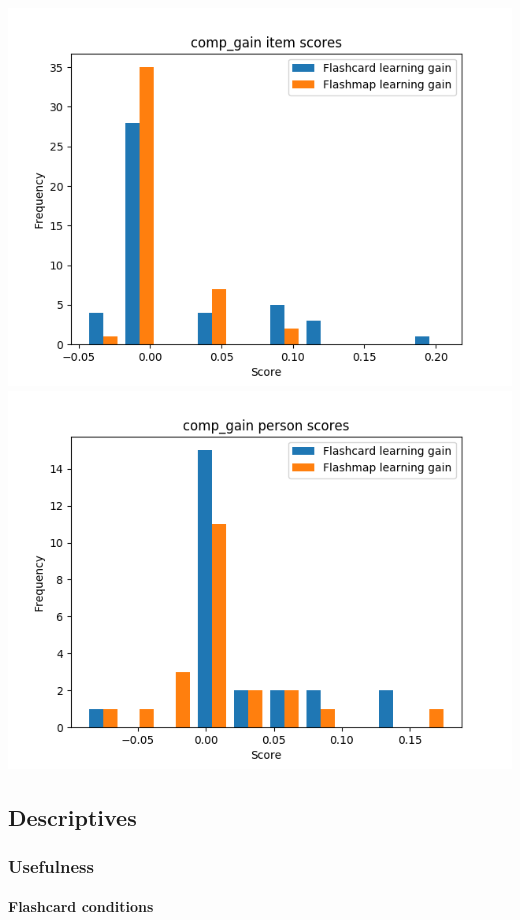 \documentclass[]{article}
\begin{document}
\includegraphics{comp_gain_diff.png}
\includegraphics{comp_gain_abil.png}

\subsection{Descriptives}\label{descriptives-2}

\subsubsection{Usefulness}\label{usefulness}

\FloatBarrier
\paragraph{Flashcard conditions}\label{flashcard-conditions-5}
\end{document}
